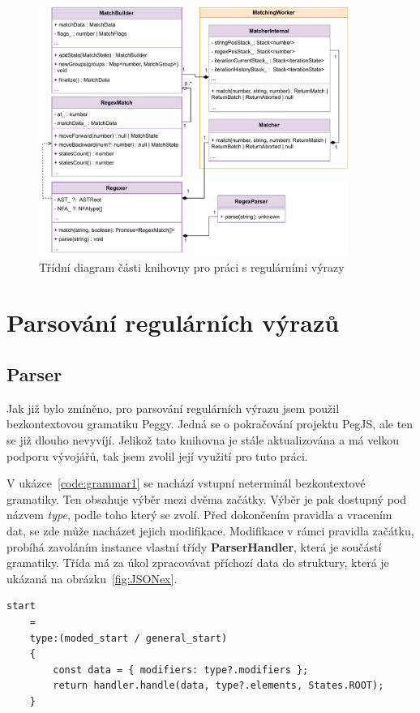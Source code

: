 \begin{figure}[!h]
	\centering
	\includegraphics[width=0.9\textwidth]{Figures/UML_RGXR.pdf}
	\caption{Třídní diagram části knihovny pro práci s regulárními výrazy}
	\label{fig:ARCH_RGXR}
\end{figure} 

\section{Parsování regulárních výrazů}\label{sec:Parse}

\subsection*{Parser}

Jak již bylo zmíněno, pro parsování regulárních výrazu jsem použil bezkontextovou gramatiku Peggy.
Jedná se o pokračování projektu PegJS, ale ten se již dlouho nevyvíjí. 
Jelikož tato knihovna je stále aktualizována a má velkou podporu vývojářů, tak jsem zvolil její využití pro tuto práci.

V ukázce~\ref{code:grammar1} se nachází vstupní neterminál bezkontextové gramatiky. 
Ten obsahuje výběr mezi dvěma začátky.
Výběr je pak dostupný pod názvem \textit{type}, podle toho který se zvolí.
Před dokončením pravidla a vracením dat, se zde může nacházet jejich modifikace.
Modifikace v rámci pravidla začátku, probíhá zavoláním instance vlastní třídy \textbf{ParserHandler}, která je součástí gramatiky.
Třída má za úkol zpracovávat příchozí data do struktury, která je ukázaná na obrázku~\ref{fig:JSONex}.

\begin{code}[!ht]
	\begin{verbatim}
start 
	= 
	type:(moded_start / general_start)
	{
		const data = { modifiers: type?.modifiers };
		return handler.handle(data, type?.elements, States.ROOT);
	}
	\end{verbatim}
	\caption{Počáteční neterminál}
	\label{code:grammar1}
\end{code}

